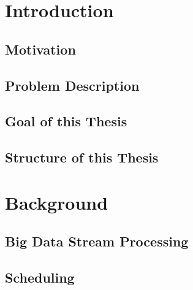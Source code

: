 



\newcommand{\titleLineOne}{Implentation of an simplistic Interface for}
\newcommand{\titleLineTwo}{  Big Data Workload Scheduler in Kubernetes}
\newcommand{\titleLineThree}{}
\newcommand{\documentdate}{December 22, 2015}
\newcommand{\studentname}{Lukas Schwerdtfeger}
\newcommand{\abstracttextde}{Kurze Zusammenfassung der Arbeit in 250 W\"ortern.}
\newcommand{\abstracttext}{Short version of the thesis in 250 words.}
\newcommand{\acktext}{This chapter is optional. First of all, I would like to...}
\providecommand{\tightlist}{%
  \setlength{\itemsep}{0pt}\setlength{\parskip}{0pt}}


 





\chapter{Introduction}
\section{Motivation}

\section{Problem Description}

\section{Goal of this Thesis}

\section{Structure of this Thesis}



\chapter{Background}
\section{Big Data Stream Processing}

\section{Scheduling}

